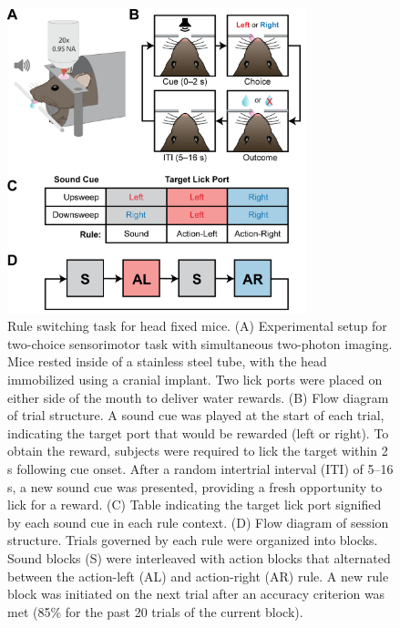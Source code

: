\begin{figure}[htbp]

\begin{center}
\includegraphics[width=8.7cm]{Figures/Fig1.png} 
\end{center}

\caption[Rule switching task for head-fixed mice.]
{Rule switching task for head fixed mice. (A) Experimental setup for two-choice sensorimotor task with simultaneous two-photon imaging. Mice rested inside of a stainless steel tube, with the head immobilized using a cranial implant. Two lick ports were placed on either side of the mouth to deliver water rewards. (B) Flow diagram of trial structure. A sound cue was played at the start of each trial, indicating the target port that would be rewarded (left or right). To obtain the reward, subjects were required to lick the target within 2 s following cue onset. After a random intertrial interval (ITI) of 5--16 s, a new sound cue was presented, providing a fresh opportunity to lick for a reward. (C) Table indicating the target lick port signified by each sound cue in each rule context. (D) Flow diagram of session structure. Trials governed by each rule were organized into blocks. Sound blocks (S) were interleaved with action blocks that alternated between the action-left (AL) and action-right (AR) rule. A new rule block was initiated on the next trial after an accuracy criterion was met (85\% for the past 20 trials of the current block).}

\label{fig:Fig1}
\end{figure}